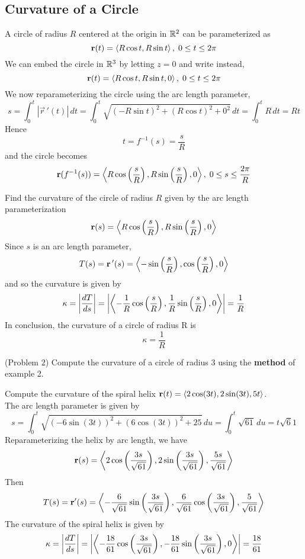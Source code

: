\documentclass[handout]{ximera}
\begin{document}
\subsection{Curvature of a Circle}
A circle of radius $R$ centered at the origin in $\mathbb R^2$ can be parameterized as
\[
\mathbf r(t) = \left\langle R\cos t, R\sin t\right\rangle, \; 0\leq t \leq 2\pi
\]
We can embed the circle in $\mathbb R^3$ by letting $z = 0$ and write instead,
\[
\mathbf r(t) = \left\langle R\cos t, R\sin t, 0\right\rangle, \; 0\leq t \leq 2\pi
\]
We now reparameterizing the circle using the arc length parameter,
\[
s = \int_0^t |\vec r\,'(t)| \, dt = \int_0^t \sqrt{ (-R\sin t)^2 + (R\cos t)^2 + 0^2} \, dt = \int_0^t R \, dt = Rt
\]
Hence 
\[
t = f^{-1}(s) = \frac{s}{R}
\]
and the circle becomes
\[
\mathbf r(f^{-1}(s)) = \left\langle R \cos\left(\frac{s}{R}\right), R \sin\left(\frac{s}{R}\right), 0\right\rangle, \; 0 \leq s \leq \frac{2\pi}{R}
\]
\begin{example}[Example 2]
Find the curvature of the circle of radius $R$ given by the arc length parameterization
\[
\mathbf r(s) = \left\langle R \cos\left(\frac{s}{R}\right), R \sin\left(\frac{s}{R}\right), 0\right\rangle
\]
Since $s$ is an arc length parameter, 
\[
T(s) = \mathbf r\,'(s) = \left\langle -\sin\left(\frac{s}{R}\right), \cos\left(\frac{s}{R}\right), 0\right\rangle
\]
and so the curvature is given by
\[
\kappa = \left|\frac{dT}{ds}\right| = \left|\left\langle -\frac{1}{R}\cos\left(\frac{s}{R}\right), \frac{1}{R}\sin\left(\frac{s}{R}\right), 0\right\rangle\right| = \frac{1}{R}
\]
In conclusion, the curvature of a circle of radius R is 
\[
\kappa = \frac{1}{R}
\]
\end{example}

\begin{problem}(Problem 2)
Compute the curvature of a circle of radius 3 using the \textbf{method} of example 2.
\end{problem}

\begin{example}[Example 3]
Compute the curvature of the spiral helix $\mathbf r(t) = \left\langle 2\cos(3t), 2 \sin(3t), 5t\right\rangle$.\\
The arc length parameter is given by
\[
s = \int_0^t \sqrt{\left(-6\sin(3t) \right)^2+\left(6\cos(3t) \right)^2 + 25} \, du = \int_0^t \sqrt{61} \, du = t\sqrt 61
\]
Reparameterizing the helix by arc length, we have
\[
\mathbf r(s) = \left\langle 2\cos\left(\frac{3s}{\sqrt{61}}\right), 2 \sin\left(\frac{3s}{\sqrt{61}}\right), \frac{5s}{\sqrt{61}}\right\rangle
\]
Then
\[
T(s) = \mathbf r'(s) = \left\langle -\frac{6}{\sqrt{61}}\sin\left(\frac{3s}{\sqrt{61}}\right), \frac{6}{\sqrt{61}}\cos\left(\frac{3s}{\sqrt{61}}\right), \frac{5}{\sqrt{61}}\right\rangle
\]
The curvature of the spiral helix is given by
\[
\kappa = \left| \frac{dT}{ds} \right| = \left|\left\langle -\frac{18}{61}\cos\left(\frac{3s}{\sqrt{61}}\right), -\frac{18}{61}\sin\left(\frac{3s}{\sqrt{61}}\right), 0\right\rangle\right| = \frac{18}{61}
\]
\end{example}
\end{document}
